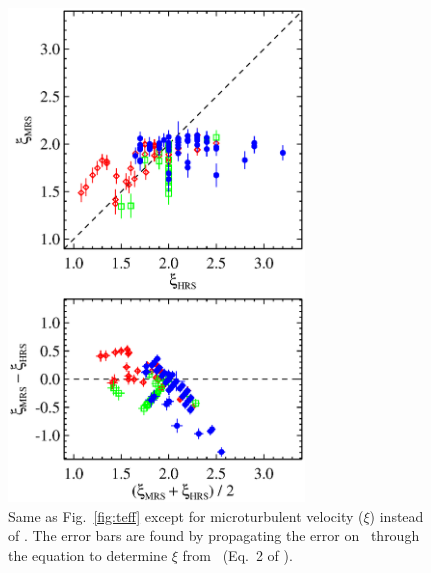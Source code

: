 \documentclass{emulateapj}
\begin{document}
\begin{figure}[p]
\centering
\begin{minipage}[t]{0.48\textwidth}
\centering
\includegraphics[width=0.7\textwidth]{vt_compare_orthogonal.eps}
\caption{Same as Fig.~\ref{fig:teff} except for microturbulent
  velocity ($\xi$) instead of \teff.  The error bars are found by
  propagating the error on \logg\ through the equation to determine
  $\xi$ from \logg\ (Eq.~2 of \citeauthor*{kir09}).\label{fig:vt}}
\end{minipage}
\hfill
\begin{minipage}[t]{0.48\textwidth}
\centering

\end{minipage}
\end{figure}
\end{document}
